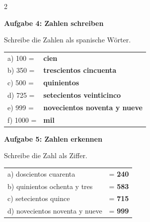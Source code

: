 \documentclass[11pt, a4paper]{article}
\newcommand{\punktebox}[1]{\hfill\fbox{\scriptsize \_\kern-1pt/#1}}
\newcommand{\lsg}[1]{\textcolor{loesung}{\textbf{#1}}}
\begin{document}
\vspace{8pt}


\begin{multicols}{2}

\textbf{\textcolor{spanisch}{Aufgabe 4: Zahlen schreiben}} \punktebox{6}

\vspace{3pt}
\small
Schreibe die Zahlen als spanische Wörter.

\vspace{4pt}
\begin{tabular}{ll}
a) 100 = & \lsg{cien} \\[0.5em]
b) 350 = & \lsg{trescientos cincuenta} \\[0.5em]
c) 500 = & \lsg{quinientos} \\[0.5em]
d) 725 = & \lsg{setecientos veinticinco} \\[0.5em]
e) 999 = & \lsg{novecientos noventa y nueve} \\[0.5em]
f) 1000 = & \lsg{mil} \\
\end{tabular}

\columnbreak

\textbf{\textcolor{spanisch}{Aufgabe 5: Zahlen erkennen}} \punktebox{4}

\vspace{3pt}
\small
Schreibe die Zahl als Ziffer.

\vspace{4pt}
\begin{tabular}{ll}
a) doscientos cuarenta & = \lsg{240} \\[0.7em]
b) quinientos ochenta y tres & = \lsg{583} \\[0.7em]
c) setecientos quince & = \lsg{715} \\[0.7em]
d) novecientos noventa y nueve & = \lsg{999} \\
\end{tabular}

\end{multicols}

\vspace{8pt}

\end{document}
